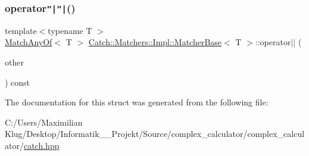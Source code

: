 \mbox{\label{struct_catch_1_1_matchers_1_1_impl_1_1_matcher_base_a5f8542b8f1567a6f9c65d0a6da7b679b}} 
\subsubsection{\texorpdfstring{operator\texttt{"|}\texttt{"|}()}{operator||()}}
{\footnotesize\ttfamily template$<$typename T $>$ \\
\mbox{\hyperlink{struct_catch_1_1_matchers_1_1_impl_1_1_match_any_of}{Match\+Any\+Of}}$<$ T $>$ \mbox{\hyperlink{struct_catch_1_1_matchers_1_1_impl_1_1_matcher_base}{Catch\+::\+Matchers\+::\+Impl\+::\+Matcher\+Base}}$<$ T $>$\+::operator$\vert$$\vert$ (\begin{DoxyParamCaption}\item[{\mbox{\hyperlink{struct_catch_1_1_matchers_1_1_impl_1_1_matcher_base}{Matcher\+Base}}$<$ T $>$ const \&}]{other }\end{DoxyParamCaption}) const}



The documentation for this struct was generated from the following file\+:\begin{DoxyCompactItemize}
\item 
C\+:/\+Users/\+Maximilian Klug/\+Desktop/\+Informatik\+\_\+\_\+\+Projekt/\+Source/complex\+\_\+calculator/complex\+\_\+calculator/\mbox{\hyperlink{catch_8hpp}{catch.\+hpp}}\end{DoxyCompactItemize}

